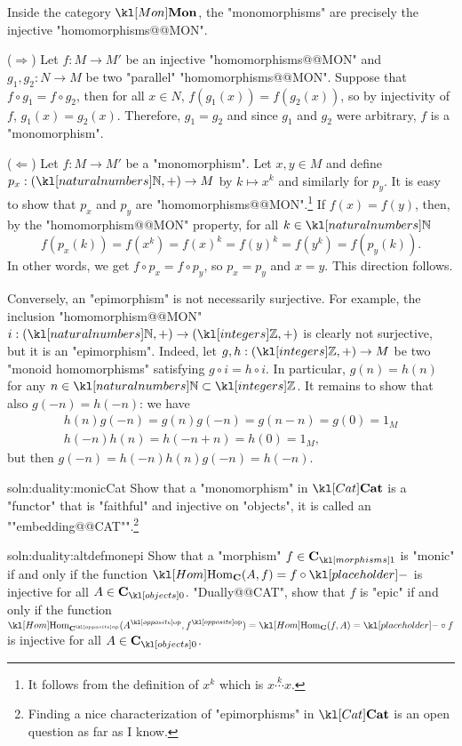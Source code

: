 \documentclass[main.tex]{subfiles}
\begin{document}
\begin{exmp}[$\catMon$]\label{exmp:monepiMON}
Inside the category $\catMon$, the "monomorphisms" are precisely the injective "homomorphisms@@MON".

($\Rightarrow$) Let $f:M\rightarrow M'$ be an injective "homomorphisms@@MON" and $g_1,g_2:N\rightarrow M$ be two "parallel" "homomorphisms@@MON". Suppose that $f\circ g_1 = f\circ g_2$, then for all $x \in N$, $f(g_1(x)) = f(g_2(x))$, so by injectivity of $f$, $g_1(x) = g_2(x)$. Therefore, $g_1 = g_2$ and since $g_1$ and $g_2$ were arbitrary, $f$ is a "monomorphism".

($\Leftarrow$) Let $f:M\rightarrow M'$ be a "monomorphism". Let $x,y \in M$ and define $p_x :(\N,+) \rightarrow M$ by $k\mapsto x^k$ and similarly for $p_y$. It is easy to show that $p_x$ and $p_y$ are "homomorphisms@@MON".\footnote{It follows from the definition of $x^k$ which is $x\stackrel{k}{\cdots}x$.} If $f(x) = f(y)$, then, by the "homomorphism@@MON" property, for all $k \in \N$
\[f(p_x(k))= f(x^k) = f(x)^k  = f(y)^k = f(y^k) = f(p_y(k)).\]
In other words, we get $f\circ p_x = f \circ p_y$, so $p_x = p_y$ and $x = y$. This direction follows.

Conversely, an "epimorphism" is not necessarily surjective. For example, the inclusion "homomorphism@@MON" $i:(\N,+) \rightarrow (\Z,+)$ is clearly not surjective, but it is an "epimorphism". Indeed, let $g,h: (\Z,+)\rightarrow M$ be two "monoid homomorphisms" satisfying $g \circ i = h\circ i$. In particular, $g(n) = h(n)$ for any $n \in \N\subset \Z$. It remains to show that also $g(-n) = h(-n)$: we have
\begin{gather*}
	h(n)g(-n) = g(n)g(-n) = g(n-n) = g(0) = 1_M\\
	h(-n)h(n) = h(-n+n) = h(0) = 1_M,
\end{gather*} but then $g(-n) = h(-n)h(n)g(-n) = h(-n)$.
\end{exmp}
\begin{exer}{soln:duality:monicCat}\label{exer:duality:monicCat}
	Show that a "monomorphism" in $\catCat$ is a "functor" that is "faithful" and injective on "objects", it is called an ""embedding@@CAT"".\footnote{Finding a nice characterization of "epimorphisms" in $\catCat$ is an open question as far as I know.} %
\end{exer}
\begin{exer}{soln:duality:altdefmonepi}\label{exer:duality:altdefmonepi}
	Show that a "morphism" $f\in \mor{\mathbf{C}}$ is "monic" if and only if the function $\Hom_{\mathbf{C}}(A,f) = f \circ \placeholder$ is injective for all $A \in \obj{\mathbf{C}}$. "Dually@@CAT", show that $f$ is "epic" if and only if the function $\Hom_{\op{\mathbf{C}}}(\op{A},\op{f}) = \Hom_{\mathbf{C}}(f,A) = \placeholder \circ f$ is injective for all $A \in \obj{\mathbf{C}}$.
\end{exer}
\end{document}
